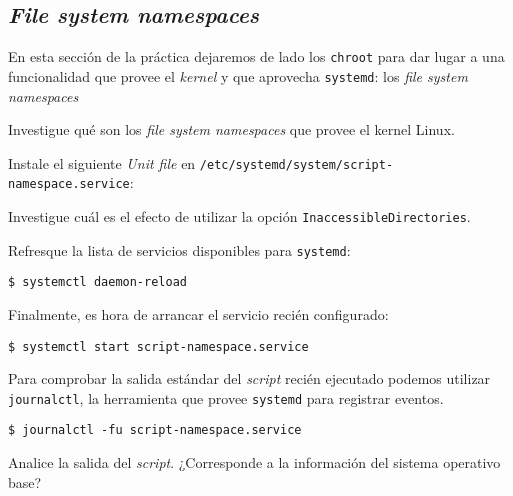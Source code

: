 \subsection{\textit{File system namespaces}}
En esta sección de la práctica dejaremos de lado los \texttt{chroot} para
dar lugar a una funcionalidad que provee el \textit{kernel} y que aprovecha
\texttt{systemd}: los \textit{file system namespaces}

\begin{questions}
  \question Investigue qué son los \textit{file system namespaces} que
  provee el kernel Linux.

  \question Instale el siguiente \textit{Unit file} en
  \texttt{/etc/systemd/system/script-namespace.service}:

  

  \question Investigue cuál es el efecto de utilizar la opción
  \texttt{InaccessibleDirectories}.

    \question Refresque la lista de servicios disponibles para
  \texttt{systemd}:
  \begin{verbatim}
$ systemctl daemon-reload
\end{verbatim}

    \question Finalmente, es hora de arrancar el servicio recién configurado:
\begin{verbatim}
$ systemctl start script-namespace.service
\end{verbatim}

    \question Para comprobar la salida estándar del \textit{script} recién
    ejecutado podemos utilizar \texttt{journalctl}, la herramienta que
    provee \texttt{systemd} para registrar eventos.
\begin{verbatim}
$ journalctl -fu script-namespace.service
\end{verbatim}

    Analice la salida del \textit{script}. ¿Corresponde a la información
    del sistema operativo base?
\end{questions}

